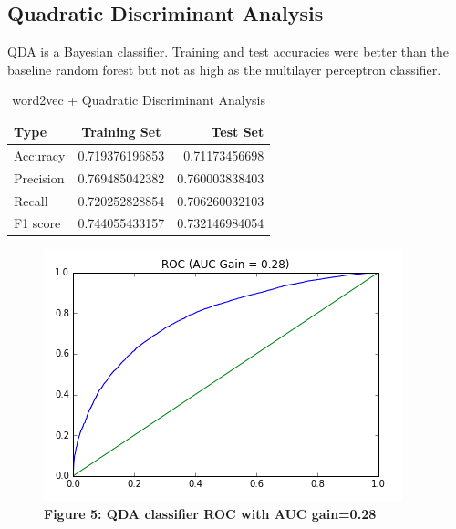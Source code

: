 \documentclass[11pt,a4paper]{article}
\begin{document}
\subsection{Quadratic Discriminant Analysis}
QDA is a Bayesian classifier. Training and test accuracies were better than the baseline random forest but not as high as the multilayer perceptron classifier. 
\begin{table}[h!]
	\begin{center}
		\caption{word2vec + Quadratic Discriminant Analysis}
		\label{tab:table1}
		\begin{tabular}{l|c|r} %
			\textbf{Type} & \textbf{Training Set} & \textbf{Test Set}\\
			\hline
			Accuracy & 0.719376196853 & 0.71173456698 \\
			Precision & 0.769485042382 & 0.760003838403 \\
			Recall & 0.720252828854  & 0.706260032103\\
			F1 score & 0.744055433157 & 0.732146984054
		\end{tabular}
	\end{center}
\end{table}

\begin{figure}[H]
	\centering\includegraphics[scale=0.55]{ROC_qda} 
	\caption{\textbf{Figure 5: QDA classifier ROC with AUC gain=0.28 }}
\end{figure}
\end{document}

